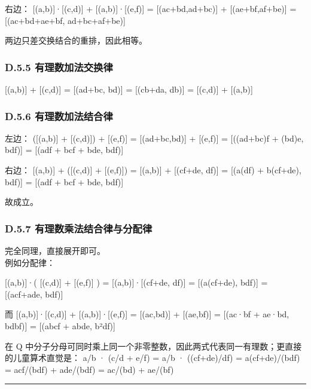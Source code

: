 \documentclass[
  11pt,
]{article}
\begin{document}
右边： {[}(a,b){]}·{[}(c,d){]} + {[}(a,b){]}·{[}(e,f){]} =
{[}(ac+bd,ad+bc){]} + {[}(ae+bf,af+be){]} = {[}(ac+bd+ae+bf,
ad+bc+af+be){]}

两边只差交换结合的重排，因此相等。

\subsubsection{D.5.5
有理数加法交换律}\label{d.5.5-ux6709ux7406ux6570ux52a0ux6cd5ux4ea4ux6362ux5f8b}

{[}(a,b){]} + {[}(c,d){]} = {[}(ad+bc, bd){]} = {[}(cb+da, db){]} =
{[}(c,d){]} + {[}(a,b){]}

\subsubsection{D.5.6
有理数加法结合律}\label{d.5.6-ux6709ux7406ux6570ux52a0ux6cd5ux7ed3ux5408ux5f8b}

左边： ({[}(a,b){]} + {[}(c,d){]}) + {[}(e,f){]} = {[}(ad+bc,bd){]} +
{[}(e,f){]} = {[}((ad+bc)f + (bd)e, bdf){]} = {[}(adf + bcf + bde,
bdf){]}

右边： {[}(a,b){]} + ({[}(c,d){]} + {[}(e,f){]}) = {[}(a,b){]} +
{[}(cf+de, df){]} = {[}(a(df) + b(cf+de), bdf){]} = {[}(adf + bcf + bde,
bdf){]}

故成立。

\subsubsection{D.5.7
有理数乘法结合律与分配律}\label{d.5.7-ux6709ux7406ux6570ux4e58ux6cd5ux7ed3ux5408ux5f8bux4e0eux5206ux914dux5f8b}

完全同理，直接展开即可。\\
例如分配律：

{[}(a,b){]}·( {[}(c,d){]} + {[}(e,f){]} ) = {[}(a,b){]}·{[}(cf+de,
df){]} = {[}(a(cf+de), bdf){]} = {[}(acf+ade, bdf){]}

而 {[}(a,b){]}·{[}(c,d){]} + {[}(a,b){]}·{[}(e,f){]} = {[}(ac,bd){]} +
{[}(ae,bf){]} = {[}(ac·bf + ae·bd, bdbf){]} = {[}(abcf + abde, b²df){]}

在 Q
中分子分母可同时乘上同一个非零整数，因此两式代表同一有理数；更直接的儿童算术直觉是：
a/b · (c/d + e/f) = a/b · ((cf+de)/df) = a(cf+de)/(bdf) = acf/(bdf) +
ade/(bdf) = ac/(bd) + ae/(bf)

\begin{center}\rule{0.5\linewidth}{0.5pt}\end{center}
\end{document}
